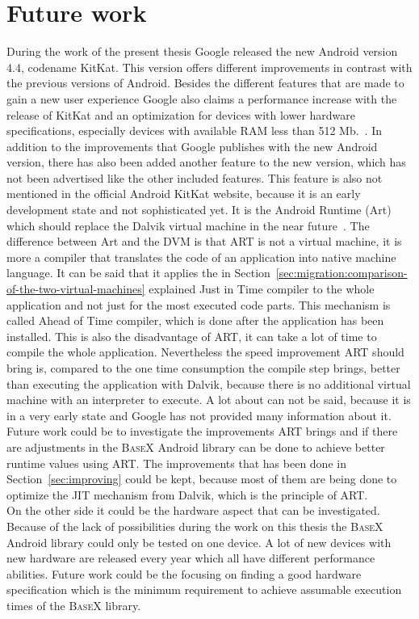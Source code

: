 \section{Future work}
\label{sec:summery:future-work}
During the work of the present thesis Google released the new Android version 4.4, codename KitKat.
This version offers different improvements in contrast with the previous versions of Android.
Besides the different features that are made to gain a new user experience Google also claims a performance increase with the release of KitKat and an optimization for devices with lower hardware specifications, especially devices with available RAM less than 512 Mb.~\cite{google-kitkat}.
In addition to the improvements that Google publishes with the new Android version, there has also been added another feature to the new version, which has not been advertised like the other included features.
This feature is also not mentioned in the official Android KitKat website, because it is an early development state and not sophisticated yet.
It is the Android Runtime (Art) which should replace the Dalvik virtual machine in the near future~\cite{android-art}.
The difference between Art and the DVM is that ART is not a virtual machine, it is more a compiler that translates the code of an application into native machine language.
It can be said that it applies the in Section~\ref{sec:migration:comparison-of-the-two-virtual-machines} explained Just in Time compiler to the whole application and not just for the most executed code parts.
This mechanism is called Ahead of Time compiler, which is done after the application has been installed.
This is also the disadvantage of ART, it can take a lot of time to compile the whole application.
Nevertheless the speed improvement ART should bring is, compared to the one time consumption the compile step brings, better than executing the application with Dalvik, because there is no additional virtual machine with an interpreter to execute.
A lot about can not be said, because it is in a very early state and Google has not provided many information about it.
Future work could be to investigate the improvements ART brings and if there are adjustments in the \textsc{BaseX} Android library can be done to achieve better runtime values using ART.
The improvements that has been done in Section~\ref{sec:improving} could be kept, because most of them are being done to optimize the JIT mechanism from Dalvik, which is the principle of ART.\\
On the other side it could be the hardware aspect that can be investigated.
Because of the lack of possibilities during the work on this thesis the \textsc{BaseX} Android library could only be tested on one device.
A lot of new devices with new hardware are released every year which all have different performance abilities.
Future work could be the focusing on finding a good hardware specification which is the minimum requirement to achieve assumable execution times of the \textsc{BaseX} library.
